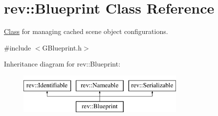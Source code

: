 \hypertarget{classrev_1_1_blueprint}{}\section{rev\+::Blueprint Class Reference}
\label{classrev_1_1_blueprint}


\mbox{\hyperlink{struct_class}{Class}} for managing cached scene object configurations.  




{\ttfamily \#include $<$G\+Blueprint.\+h$>$}

Inheritance diagram for rev\+::Blueprint\+:\begin{figure}[H]
\begin{center}
\leavevmode
\includegraphics[height=2.000000cm]{classrev_1_1_blueprint}
\end{center}
\end{figure}
